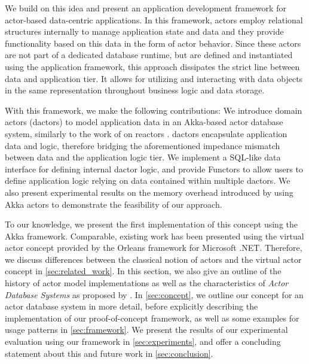   We build on this idea and present an application development framework for actor-based data-centric applications.
  In this framework, actors employ relational structures internally to manage application state and data
  and they provide functionality based on this data in the form of actor behavior.
  Since these actors are not part of a dedicated database runtime, but are defined and instantiated using the application framework, this approach dissipates the strict line between data and application tier.
  It allows for utilizing and interacting with data objects in the same representation throughout business logic and data storage.

  With this framework, we make the following contributions:
  We introduce domain actors (\glspl{dactor}) to model application data in an Akka-based actor database system, similarly to the work of \citeauthor{Shah:reactdb} on reactors \cite{Shah:reactdb}.
  \Glspl{dactor} encapsulate application data and logic, therefore bridging the aforementioned impedance mismatch between data and the application logic tier.
  We implement a SQL-like data interface for defining internal \gls{dactor} logic, and provide Functors to allow users to define application logic relying on data contained within multiple \glspl{dactor}.
  We also present experimental results on the memory overhead introduced by using Akka actors to demonstrate the feasibility of our approach.

  To our knowledge, we present the first implementation of this concept using the Akka framework.
  Comparable, existing work has been presented using the virtual actor concept provided by the Orleans framework for Microsoft .NET.
  Therefore, we discuss differences between the classical notion of actors and the virtual actor concept in \cref{sec:related_work}.
  In this section, we also give an outline of the history of actor model implementations as well as the characteristics of \textit{Actor Database Systems} as proposed by \citeauthor{manifesto}.
  In \cref{sec:concept}, we outline our concept for an actor database system in more detail,
  before explicitly describing the implementation of our proof-of-concept framework, as well as some examples for usage patterns in \cref{sec:framework}.
  We present the results of our experimental evaluation using our framework in \cref{sec:experiments},
  and offer a concluding statement about this and future work in \cref{sec:conclusion}.
  
